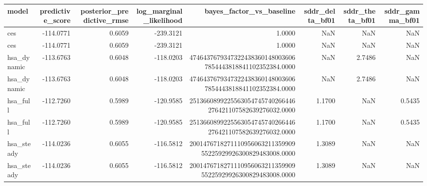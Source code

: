 \begin{tabular}{lrrrrrrr}
\toprule
model & predictive\_score & posterior\_predictive\_rmse & log\_marginal\_likelihood & bayes\_factor\_vs\_baseline & sddr\_delta\_bf01 & sddr\_theta\_bf01 & sddr\_gamma\_bf01 \\
\midrule
ces & -114.0771 & 0.6059 & -239.3121 & 1.0000 & NaN & NaN & NaN \\
ces & -114.0771 & 0.6059 & -239.3121 & 1.0000 & NaN & NaN & NaN \\
hsa\_dynamic & -113.6763 & 0.6048 & -118.0203 & 47464376793473224383601480036067854443818841102352384.0000 & NaN & 2.7486 & NaN \\
hsa\_dynamic & -113.6763 & 0.6048 & -118.0203 & 47464376793473224383601480036067854443818841102352384.0000 & NaN & 2.7486 & NaN \\
hsa\_full & -112.7260 & 0.5989 & -120.9585 & 2513660899225563054745740266446276421107582639276032.0000 & 1.1700 & NaN & 0.5435 \\
hsa\_full & -112.7260 & 0.5989 & -120.9585 & 2513660899225563054745740266446276421107582639276032.0000 & 1.1700 & NaN & 0.5435 \\
hsa\_steady & -114.0236 & 0.6055 & -116.5812 & 200147671827111095606321135990955225929926300829483008.0000 & 1.3089 & NaN & NaN \\
hsa\_steady & -114.0236 & 0.6055 & -116.5812 & 200147671827111095606321135990955225929926300829483008.0000 & 1.3089 & NaN & NaN \\
\bottomrule
\end{tabular}

